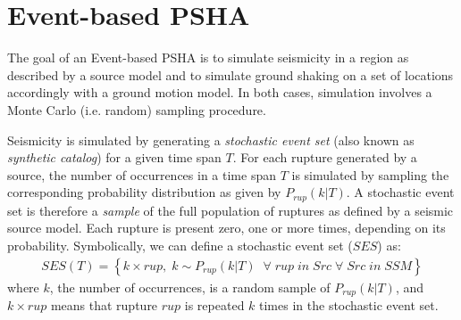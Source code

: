 \section{Event-based PSHA}
The goal of an Event-based PSHA is to simulate seismicity in a region as described by a source model
and to simulate ground shaking on a set of locations accordingly with a ground motion model. In both
cases, simulation involves a Monte Carlo (i.e. random) sampling procedure.

Seismicity is simulated by generating a \textit{stochastic event set} (also known as \textit{synthetic catalog})
for a given time span $T$. For each rupture generated by a source,
the number of occurrences in a time span $T$ is simulated by sampling the corresponding probability
distribution as given by $P_{rup}(k | T)$. A stochastic event set is therefore a \textit{sample}
of the full population of ruptures as defined by a seismic source model. Each rupture is present zero, one or
more times, depending on its probability. Symbolically, we can define a stochastic event set ($SES$) as:
\begin{align}
SES(T) = \left\{k \times rup,\;k\sim P_{rup}(k | T)\;\;\forall\;rup\;in\;Src\;\forall\;Src\;in\;SSM\right\}
\end{align}
where $k$, the number of occurrences, is a random sample of $P_{rup}(k | T)$, and $k \times rup$ means
that rupture $rup$ is repeated $k$ times in the stochastic event set.

